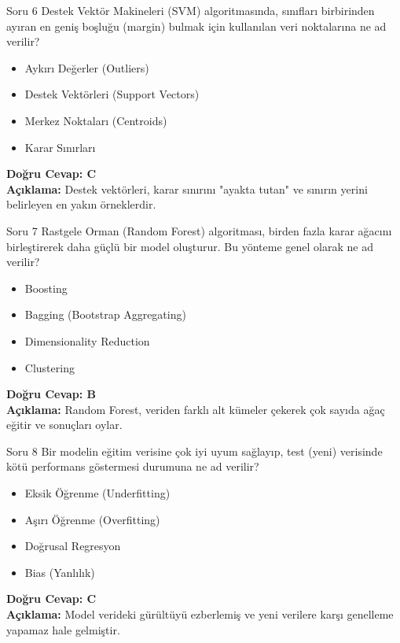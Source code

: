 \documentclass[12pt,a4paper]{article}
\begin{document}
\begin{testcard}{Soru 6}
    Destek Vektör Makineleri (SVM) algoritmasında, sınıfları birbirinden ayıran en geniş boşluğu (margin) bulmak için kullanılan veri noktalarına ne ad verilir?
    \begin{itemize}
        \item[A)] Aykırı Değerler (Outliers)
        \item[B)] Destek Vektörleri (Support Vectors)
        \item[C)] Merkez Noktaları (Centroids)
        \item[D)] Karar Sınırları
    \end{itemize}
    \tcblower
    \textbf{Doğru Cevap: C} \\
    \textbf{Açıklama:} Destek vektörleri, karar sınırını "ayakta tutan" ve sınırın yerini belirleyen en yakın örneklerdir.
\end{testcard}

\begin{testcard}{Soru 7}
    Rastgele Orman (Random Forest) algoritması, birden fazla karar ağacını birleştirerek daha güçlü bir model oluşturur. Bu yönteme genel olarak ne ad verilir?
    \begin{itemize}
        \item[A)] Boosting
        \item[B)] Bagging (Bootstrap Aggregating)
        \item[C)] Dimensionality Reduction
        \item[D)] Clustering
    \end{itemize}
    \tcblower
    \textbf{Doğru Cevap: B} \\
    \textbf{Açıklama:} Random Forest, veriden farklı alt kümeler çekerek çok sayıda ağaç eğitir ve sonuçları oylar.
\end{testcard}

\begin{testcard}{Soru 8}
    Bir modelin eğitim verisine çok iyi uyum sağlayıp, test (yeni) verisinde kötü performans göstermesi durumuna ne ad verilir?
    \begin{itemize}
        \item[A)] Eksik Öğrenme (Underfitting)
        \item[B)] Aşırı Öğrenme (Overfitting)
        \item[C)] Doğrusal Regresyon
        \item[D)] Bias (Yanlılık)
    \end{itemize}
    \tcblower
    \textbf{Doğru Cevap: C} \\
    \textbf{Açıklama:} Model verideki gürültüyü ezberlemiş ve yeni verilere karşı genelleme yapamaz hale gelmiştir.
\end{testcard}
\end{document}

